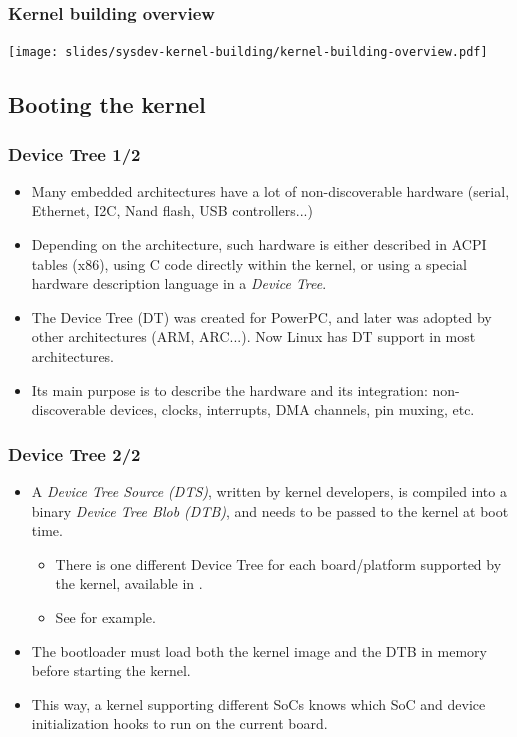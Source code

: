 \begin{frame}
  \frametitle{Kernel building overview}
  \begin{center}
    \texttt{[image: slides/sysdev-kernel-building/kernel-building-overview.pdf]}
  \end{center}
\end{frame}

\subsection{Booting the kernel}

\begin{frame}
  \frametitle{Device Tree 1/2}
  \begin{itemize}
  \item Many embedded architectures have a lot of non-discoverable
    hardware (serial, Ethernet, I2C, Nand flash, USB  controllers...)
  \item Depending on the architecture, such hardware is either
    described in ACPI tables (x86), using C code directly within the kernel,
    or using a special hardware description language in a {\em Device Tree}.
  \item The Device Tree (DT) was created for PowerPC, and later was
    adopted by other architectures (ARM, ARC...). Now Linux
    has DT support in most architectures.
  \item Its main purpose is to describe the hardware and its integration:
    non-discoverable devices, clocks, interrupts, DMA channels, pin
    muxing, etc.
  \end{itemize}
\end{frame}

\begin{frame}
  \frametitle{Device Tree 2/2}
  \begin{itemize}
  \item A {\em Device Tree Source (DTS)}, written by kernel developers,
    is compiled into a binary {\em Device Tree Blob (DTB)}, and needs to
    be passed to the kernel at boot time.
    \begin{itemize}
    \item There is one different Device Tree for each board/platform
      supported by the kernel, available in
      .
     \item See  for
      example.
    \end{itemize}
  \item The bootloader must load both the kernel image and the DTB
    in memory before starting the kernel.
  \item This way, a kernel supporting different SoCs knows which
    SoC and device initialization hooks to run on the current board.
  \end{itemize}
\end{frame}
